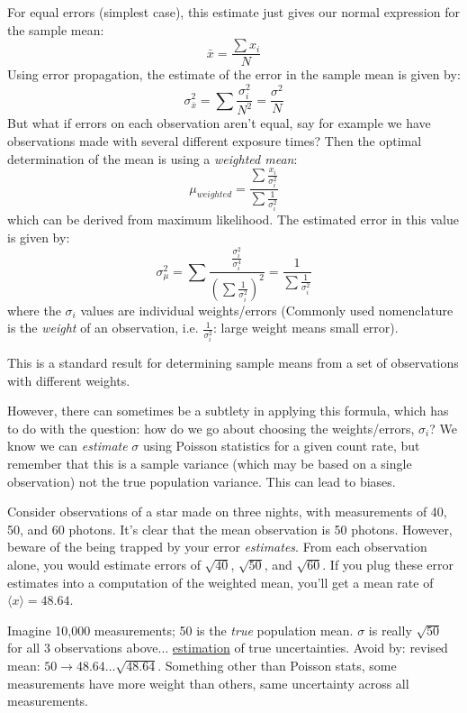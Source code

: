 \documentclass[12pt]{article}
\newcommand{\mynotes}[1]{\textcolor{myBlue}{#1}}
\begin{document}
For equal errors (simplest case), this estimate just gives our normal
expression for the sample mean:
\[
    \bar{x} = \frac{\sum x_{i}}{N}
    \]
Using error propagation, the estimate of the error in the sample mean
is given by:
\[
     \sigma_{\bar{x}}^{2} = \sum\frac{\sigma_{i}^{2}}{N^{2}}
       = \frac{\sigma^{2}}{N}
       \]
But what if errors on each observation aren't equal, say for example
we have observations made with several different exposure times? Then
the optimal determination of the mean is using a \textit{weighted mean}:
\[
     \mu_{weighted} = \frac{\sum\frac{x_{i}}{\sigma_{i}^{2}}}
       {\sum\frac{1}{\sigma_{i}^{2}}}
       \]
\mynotes{which can be derived from maximum likelihood.}
The estimated error in this value is given by:
\[
    \sigma_{\mu}^{2} = \sum\frac{\frac{\sigma_{i}^{2}}{\sigma_{i}^{4}}}
       {(\sum\frac{1}{\sigma_{i}^{2}})^{2}}
       = \frac{1}{\sum\frac{1}{\sigma_{i}^{2}}}
       \]
where the $\sigma_{i}$ values are individual weights/errors
(Commonly used nomenclature is the \emph{weight} of an observation, i.e.
$\frac{1}{\sigma_{i}^{2}}$: large weight means small error).

This is a standard result for determining sample means from a set of
observations with different weights.

However, there can sometimes be a subtlety in applying this formula, which has
to do with the question: how do we go about choosing the weights/errors,
$\sigma_{i}$? We know we can \emph{estimate} $\sigma$ using Poisson statistics
for a given count rate, but remember that this is a sample variance (which may
be based on a single observation) not the true population variance. This can
lead to biases.

Consider observations of a star made on three nights, with measurements of 40,
50, and 60 photons. It's clear that the mean observation is 50 photons.
However, beware of the being trapped by your error \emph{estimates}. From each
observation alone, you would estimate errors of $\sqrt{40}$, $\sqrt{50}$, and
$\sqrt{60}$. If you plug these error estimates into a computation of the
weighted mean, you'll get a mean rate of $ \langle x \rangle =48.64$.

\mynotes{Imagine 10,000 measurements; 50 is the \emph{true}
population mean. $\sigma$ is really $\sqrt{50}$ for all 3 observations
above$\ldots$ \underline{estimation} of true uncertainties.
Avoid by: revised mean: $50 \rightarrow 48.64 \ldots
\sqrt{48.64}$. Something other than Poisson stats, some measurements
have more weight than others, same uncertainty across all
measurements.}
\end{document}
